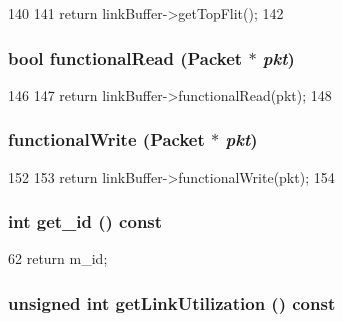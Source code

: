 \begin{DoxyCode}
140 {
141     return linkBuffer->getTopFlit();
142 }
\end{DoxyCode}
\hypertarget{classNetworkLink_a6db56c593ee28a561c47e75a859300dd}{
\subsubsection[{functionalRead}]{\setlength{\rightskip}{0pt plus 5cm}bool functionalRead ({\bf Packet} $\ast$ {\em pkt})}}
\label{classNetworkLink_a6db56c593ee28a561c47e75a859300dd}



\begin{DoxyCode}
146 {
147     return linkBuffer->functionalRead(pkt);
148 }
\end{DoxyCode}
\hypertarget{classNetworkLink_aba9037f662122b5f2e85647d35670e5c}{
\subsubsection[{functionalWrite}]{ functionalWrite ({\bf Packet} $\ast$ {\em pkt})}}
\label{classNetworkLink_aba9037f662122b5f2e85647d35670e5c}



\begin{DoxyCode}
152 {
153     return linkBuffer->functionalWrite(pkt);
154 }
\end{DoxyCode}
\hypertarget{classNetworkLink_acbd793db2c457c9c720b8c9084cf3be9}{
\subsubsection[{get\_\-id}]{\setlength{\rightskip}{0pt plus 5cm}int get\_\-id () const}}
\label{classNetworkLink_acbd793db2c457c9c720b8c9084cf3be9}



\begin{DoxyCode}
62 { return m_id; }
\end{DoxyCode}
\hypertarget{classNetworkLink_a268a57ca669794bfa1abea88af8fe2f9}{
\subsubsection[{getLinkUtilization}]{\setlength{\rightskip}{0pt plus 5cm}unsigned int getLinkUtilization () const}}
\label{classNetworkLink_a268a57ca669794bfa1abea88af8fe2f9}



